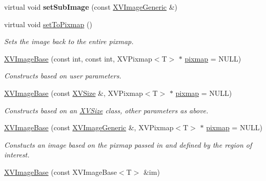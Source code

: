 \begin{CompactItemize}
\item 
\label{XVImageBase_a16}
\hypertarget{class_XVImageBase_a16}{
virtual void {\bf set\-Sub\-Image} (const \hyperlink{class_XVImageGeneric}{XVImage\-Generic} \&)}

\item 
virtual void \hyperlink{class_XVImageBase_a17}{set\-To\-Pixmap} ()
\begin{CompactList}\small\item\em Sets the image back to the entire pixmap.\item\end{CompactList}\item 
\hyperlink{class_XVImageBase_a18}{XVImage\-Base} (const int, const int, XVPixmap$<$T$>$ $\ast$ \hyperlink{class_XVImageBase_n1}{pixmap} = NULL)
\begin{CompactList}\small\item\em Constructs based on user parameters.\item\end{CompactList}\item 
\hyperlink{class_XVImageBase_a19}{XVImage\-Base} (const \hyperlink{class_XVSize}{XVSize} \&, XVPixmap$<$T$>$ $\ast$ \hyperlink{class_XVImageBase_n1}{pixmap} = NULL)
\begin{CompactList}\small\item\em Constructs based on an \hyperlink{class_XVSize}{XVSize} class, other parameters as above.\item\end{CompactList}\item 
\hyperlink{class_XVImageBase_a20}{XVImage\-Base} (const \hyperlink{class_XVImageGeneric}{XVImage\-Generic} \&, XVPixmap$<$T$>$ $\ast$ \hyperlink{class_XVImageBase_n1}{pixmap} = NULL)
\begin{CompactList}\small\item\em Constucts an image based on the pixmap passed in and defined by the region of interest.\item\end{CompactList}\item 
\label{XVImageBase_a21}
\hypertarget{class_XVImageBase_a21}{
\hyperlink{class_XVImageBase_a21}{XVImage\-Base} (const XVImage\-Base$<$T$>$ \&im)}


\end{CompactItemize}
